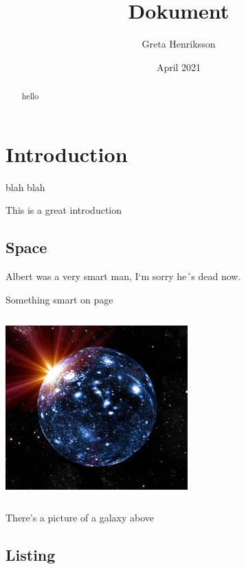 \documentclass{article}
\title{Dokument}
\author{Greta Henriksson}
\date{April 2021}
\begin{document}
\tableofcontents
 
\begin{abstract}
    
    hello
\end{abstract}
\maketitle

\section{Introduction}
blah blah


This is a great introduction
 \subsection{Space}

\cite{dirac} Albert was a very smart man, I`m sorry he´s dead now. 

 Something smart on page 

\includegraphics[width=7cm, height=7cm]{images/universe.PNG}


There's a picture of a galaxy above

 \subsection{Listing}

\end{document}

